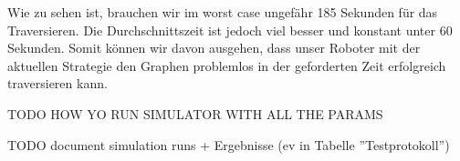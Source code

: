 Wie zu sehen ist, brauchen wir im worst case ungefähr 185 Sekunden für das Traversieren. 
Die Durchschnittszeit ist jedoch viel besser und konstant unter 60 Sekunden.
Somit können wir davon ausgehen, dass unser Roboter mit der aktuellen Strategie den Graphen problemlos in der geforderten Zeit erfolgreich traversieren kann.

TODO HOW YO RUN SIMULATOR WITH ALL THE PARAMS

TODO document simulation runs + Ergebnisse (ev in Tabelle ''Testprotokoll'')